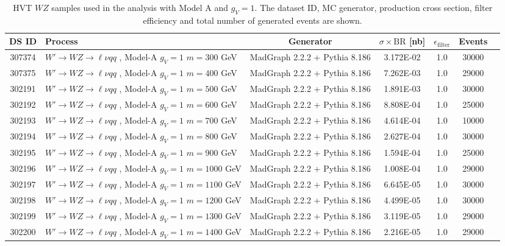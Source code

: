 \begin{landscape}
	\begin{table}[!htb]
		\caption{HVT $WZ$ samples used in the analysis with Model A and $g_V=1$. The dataset ID, MC generator, production cross section, filter efficiency and total number of generated events are shown.}
		\label{tabular:mc_samples_Wprime}
		\begin{footnotesize}
			\begin{center}
				\begin{tabular}{|c|l|c|c|c|c|r|}
					\hline
					DS ID & Process & Generator & $\sigma\times\text{BR}$ [nb] & $\epsilon_{\text{filter}}$ & Events \\ \hline
					307374 & $W' \to WZ \to \ell\nu qq $ , Model-A $g_V=1$ $m=300$  GeV& MadGraph 2.2.2 + Pythia 8.186 & 3.172E-02  & 1.0& 30000 \\ 
					307375 & $W' \to WZ \to \ell\nu qq $ , Model-A $g_V=1$ $m=400$  GeV& MadGraph 2.2.2 + Pythia 8.186 & 7.262E-03 & 1.0& 29000 \\ 
					302191 & $W' \to WZ \to \ell\nu qq $ , Model-A $g_V=1$ $m=500$  GeV& MadGraph 2.2.2 + Pythia 8.186 & 1.891E-03 & 1.0& 30000 \\ 
					302192 & $W' \to WZ \to \ell\nu qq $ , Model-A $g_V=1$ $m=600$  GeV& MadGraph 2.2.2 + Pythia 8.186 & 8.808E-04 & 1.0& 25000 \\ 
					302193 & $W' \to WZ \to \ell\nu qq $ , Model-A $g_V=1$ $m=700$  GeV& MadGraph 2.2.2 + Pythia 8.186 & 4.614E-04 & 1.0& 10000 \\ 
					302194 & $W' \to WZ \to \ell\nu qq $ , Model-A $g_V=1$ $m=800$  GeV& MadGraph 2.2.2 + Pythia 8.186 & 2.627E-04 & 1.0& 30000 \\ 
					302195 & $W' \to WZ \to \ell\nu qq $ , Model-A $g_V=1$ $m=900$  GeV& MadGraph 2.2.2 + Pythia 8.186 & 1.594E-04 & 1.0& 25000 \\ 
					302196 & $W' \to WZ \to \ell\nu qq $ , Model-A $g_V=1$ $m=1000$ GeV& MadGraph 2.2.2 + Pythia 8.186 & 1.008E-04 & 1.0& 29000 \\ 
					302197 & $W' \to WZ \to \ell\nu qq $ , Model-A $g_V=1$ $m=1100$ GeV& MadGraph 2.2.2 + Pythia 8.186 & 6.645E-05 & 1.0& 30000 \\ 
					302198 & $W' \to WZ \to \ell\nu qq $ , Model-A $g_V=1$ $m=1200$ GeV& MadGraph 2.2.2 + Pythia 8.186 & 4.499E-05 & 1.0& 30000 \\ 
					302199 & $W' \to WZ \to \ell\nu qq $ , Model-A $g_V=1$ $m=1300$ GeV& MadGraph 2.2.2 + Pythia 8.186 & 3.119E-05 & 1.0& 29000 \\ 
					302200 & $W' \to WZ \to \ell\nu qq $ , Model-A $g_V=1$ $m=1400$ GeV& MadGraph 2.2.2 + Pythia 8.186 & 2.216E-05 & 1.0& 29000 \\ 

\end{tabular}
\end{center}
\end{footnotesize}
\end{table}
\end{landscape}

